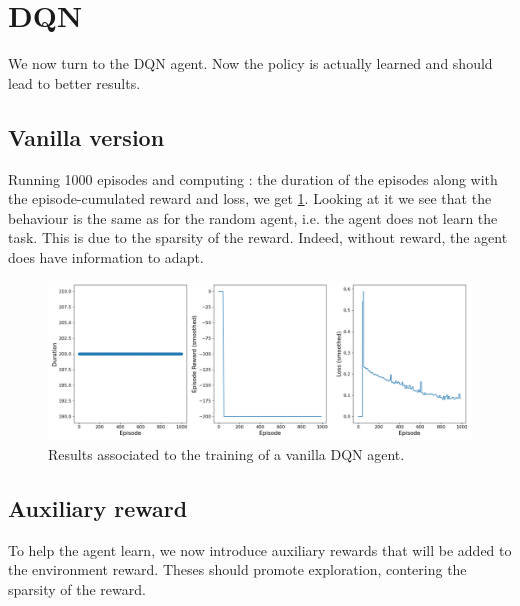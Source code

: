 \documentclass[a4paper, 12pt,oneside]{article}
\begin{document}
    \section{DQN}
    We now turn to the DQN agent. Now the policy is actually learned and should lead to better results. 
        \subsection{Vanilla version}
        Running 1000 episodes and computing : the duration of the episodes along with the episode-cumulated reward and loss, we get \ref{fig:dqn-vanilla-neps=1000}. Looking at it we see that the behaviour is the same as for the random agent, i.e. the agent does not learn the task. This is due to the sparsity of the reward. Indeed, without reward, the agent does have information to adapt. 
        \begin{figure}[h!]
            \centering
            \vspace{0em}
            \includegraphics[width=.9\textwidth]{../runs/dqn_vanilla/up-tau=1/figs/full_results}
            \caption{Results associated to the training of a vanilla DQN agent.}
            \label{fig:dqn-vanilla-neps=1000}
        \end{figure}
        
        \subsection{Auxiliary reward}
        To help the agent learn, we now introduce auxiliary rewards that will be added to the environment reward. Theses should promote exploration, contering the sparsity of the reward. 
\end{document}
